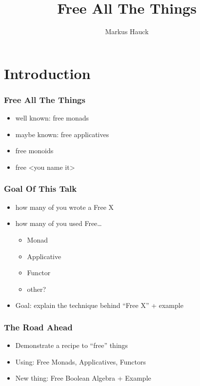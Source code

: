 \documentclass{beamer}
\title{Free All The Things}
\author{Markus Hauck}
\begin{document}
\begin{frame}
  \titlepage{}
\end{frame}

\section{Introduction}\label{sec:introduction}

\begin{frame}
\frametitle{Free All The Things}
\begin{itemize}
\item well known: free monads
\item maybe known: free applicatives
\item free monoids
\item free <you name it>
\end{itemize}
\end{frame}

\begin{frame}
  \frametitle{Goal Of This Talk}
  \begin{itemize}
  \item how many of you wrote a Free X
  \item how many of you used Free\ldots
    \begin{itemize}
    \item Monad
    \item Applicative
    \item Functor
    \item other?
    \end{itemize}
  \item Goal: explain the technique behind ``Free X'' + example
  \end{itemize}
\end{frame}

\begin{frame}
  \frametitle{The Road Ahead}
  \begin{itemize}
  \item Demonstrate a recipe to ``free'' things
  \item Using: Free Monads, Applicatives, Functors
  \item New thing: Free Boolean Algebra + Example
  \end{itemize}
\end{frame}
\end{document}
